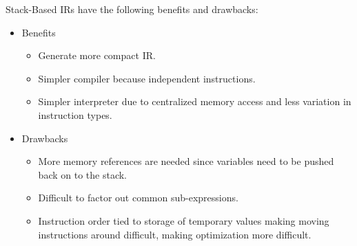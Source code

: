 \begin{definition}
    Stack-Based IRs have the following benefits and drawbacks:
    \begin{itemize}
        \item Benefits
        \begin{itemize}
            \item Generate more compact IR.
            \item Simpler compiler because independent instructions.
            \item Simpler interpreter due to centralized memory access and less variation in instruction types.
        \end{itemize}
        \item Drawbacks
        \begin{itemize}
            \item More memory references are needed since variables need to be pushed back on to the stack.
            \item Difficult to factor out common sub-expressions.
            \item Instruction order tied to storage of temporary values making moving instructions around difficult, making optimization more difficult.
        \end{itemize}
    \end{itemize}
\end{definition}
